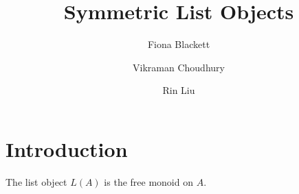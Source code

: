 \documentclass[acmsmall,natbib=false,nonacm,review,screen]{acmart}
\begin{document}
\title{Symmetric List Objects}

\author{Fiona Blackett}

\author{Vikraman Choudhury}

\author{Rin Liu}



\maketitle

\section{Introduction}
\label{sec:introduction}



\newpage





\begin{theorem}
    The list object $L(A)$ is the free monoid on $A$.
\end{theorem}


\end{document}
